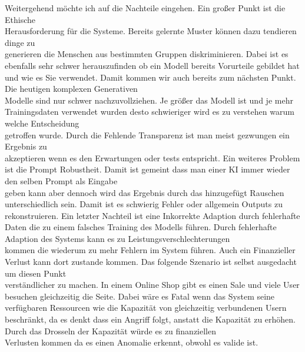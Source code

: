 Weitergehend möchte ich auf die Nachteile eingehen. Ein großer Punkt ist die Ethische \\ Herausforderung für die Systeme. Bereits gelernte Muster können dazu tendieren dinge zu \\ generieren die Menschen aus bestimmten Gruppen diskriminieren. Dabei ist es ebenfalls sehr schwer herauszufinden ob ein Modell bereits Vorurteile gebildet hat und wie es Sie verwendet\cite{Bias}. Damit kommen wir auch bereits zum nächsten Punkt. Die heutigen komplexen Generativen \\ Modelle sind nur schwer nachzuvollziehen. Je größer das Modell ist und je mehr Trainingsdaten verwendet wurden desto schwieriger wird es zu verstehen warum welche Entscheidung \\ getroffen wurde. Durch die Fehlende Transparenz ist man meist gezwungen ein Ergebnis zu \\ akzeptieren wenn es den Erwartungen oder tests entspricht\cite{explainability}. Ein weiteres Problem ist die Prompt Robustheit. Damit ist gemeint dass man einer KI immer wieder den selben Prompt als Eingabe \\ geben kann aber dennoch wird das Ergebnis durch das hinzugefügt Rauschen unterschiedlich sein. Damit ist es schwierig Fehler oder allgemein Outputs zu rekonstruieren\cite{robustness}. Ein letzter Nachteil ist eine Inkorrekte Adaption durch fehlerhafte Daten die zu einem falsches Training des Modells führen. Durch fehlerhafte Adaption des Systems kann es zu Leistungsverschlechterungen \\ kommen die wiederum zu mehr Fehlern im System führen\cite{Adaption}. Auch ein Finanzieller Verlust kann dort zustande kommen. Das folgende Szenario ist selbst ausgedacht um diesen Punkt \\ verständlicher zu machen. In einem Online Shop gibt es einen Sale und viele User besuchen gleichzeitig die Seite. Dabei wäre es Fatal wenn das System seine verfügbaren Ressourcen wie die Kapazität von gleichzeitig verbundenen Usern beschränkt, da es denkt dass ein Angriff folgt, anstatt die Kapazität zu erhöhen. Durch das Drosseln der Kapazität würde es zu finanziellen \\ Verlusten kommen da es einen Anomalie erkennt, obwohl es valide ist. 
\nAbsatz
